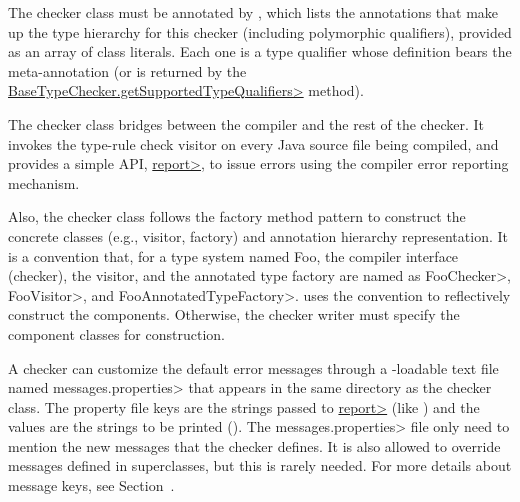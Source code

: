 The checker class must be annotated by
, which lists the annotations
that make up the type hierarchy for this checker (including
polymorphic qualifiers), provided as an array of class literals.  Each
one is a type qualifier whose definition bears the
 meta-annotation (or is
returned by the
\href{http://types.cs.washington.edu/checker-framework/api/org/checkerframework/framework/type/AnnotatedTypeFactory.html#getSupportedTypeQualifiers--}{\<BaseTypeChecker\-.getSupportedTypeQualifiers>}
method).

The checker class bridges between the compiler and the rest of the checker.  It
invokes the type-rule check visitor on every Java source file being
compiled, and provides a simple API, \href{http://types.cs.washington.edu/dev/checker-framework/api/org/checkerframework/framework/source/SourceChecker.html#report-org.checkerframework.framework.source.Result-java.lang.Object-}{\<report>}, to issue
errors using the compiler error reporting mechanism.

Also, the checker class follows the factory method pattern to
construct the concrete classes (e.g., visitor, factory) and annotation
hierarchy representation.  It is a convention that, for
a type system named Foo, the compiler
interface (checker), the visitor, and the annotated type factory are
named as \<FooChecker>, \<FooVisitor>, and \<FooAnnotatedTypeFactory>.
 uses the convention to
reflectively construct the components.  Otherwise, the checker writer
must specify the component classes for construction.

\begin{sloppypar}
A checker can customize the default error messages through a
-loadable text file named
\<messages.properties> that appears in the same directory as the checker class.
The property file keys are the strings passed to \href{http://types.cs.washington.edu/dev/checker-framework/api/org/checkerframework/framework/source/SourceChecker.html#report-org.checkerframework.framework.source.Result-java.lang.Object-}{\<report>}
(like ) and the values are the strings to be
printed ().
The \<messages.properties> file only need to mention the new messages that
the checker defines.
It is also allowed to override messages defined in superclasses, but this
is rarely needed.
For more details about message keys, see Section~.
\end{sloppypar}



